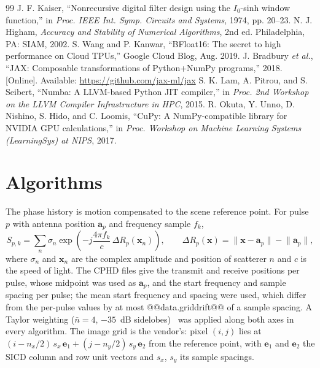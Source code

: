 \documentclass[11pt]{article}
\begin{document}
\begin{thebibliography}{99}
 J. F. Kaiser, ``Nonrecursive digital filter design using the $I_0$-sinh window function,'' in \emph{Proc. IEEE Int. Symp. Circuits and Systems}, 1974, pp. 20--23.
 N. J. Higham, \emph{Accuracy and Stability of Numerical Algorithms}, 2nd ed. Philadelphia, PA: SIAM, 2002.
 S. Wang and P. Kanwar, ``BFloat16: The secret to high performance on Cloud TPUs,'' Google Cloud Blog, Aug. 2019.
 J. Bradbury \emph{et al.}, ``JAX: Composable transformations of Python+NumPy programs,'' 2018. [Online]. Available: \url{https://github.com/jax-ml/jax}
 S. K. Lam, A. Pitrou, and S. Seibert, ``Numba: A LLVM-based Python JIT compiler,'' in \emph{Proc. 2nd Workshop on the LLVM Compiler Infrastructure in HPC}, 2015.
 R. Okuta, Y. Unno, D. Nishino, S. Hido, and C. Loomis, ``CuPy: A NumPy-compatible library for NVIDIA GPU calculations,'' in \emph{Proc. Workshop on Machine Learning Systems (LearningSys) at NIPS}, 2017.
\end{thebibliography}

\clearpage
\appendix
\section{Algorithms}
\label{app:algorithms}

The phase history is motion compensated to the scene reference point. For pulse $p$ with antenna position $\mathbf{a}_p$ and frequency sample $f_k$,
\begin{equation}
S_{p,k} = \sum_n \sigma_n \exp\!\left(-j \frac{4\pi f_k}{c}\, \Delta R_p(\mathbf{x}_n)\right),
\qquad
\Delta R_p(\mathbf{x}) = \lVert \mathbf{x} - \mathbf{a}_p \rVert - \lVert \mathbf{a}_p \rVert ,
\label{eq:signal}
\end{equation}
where $\sigma_n$ and $\mathbf{x}_n$ are the complex amplitude and position of scatterer $n$ and $c$ is the speed of light. The CPHD files give the transmit and receive positions per pulse, whose midpoint was used as $\mathbf{a}_p$, and the start frequency and sample spacing per pulse; the mean start frequency and spacing were used, which differ from the per-pulse values by at most @@data.griddrift@@ of a sample spacing. A Taylor weighting ($\bar{n}=4$, $-35$~dB sidelobes)~\cite{taylor1955} was applied along both axes in every algorithm. The image grid is the vendor's: pixel $(i, j)$ lies at $(i - n_x/2)\,s_x\,\mathbf{e}_1 + (j - n_y/2)\,s_y\,\mathbf{e}_2$ from the reference point, with $\mathbf{e}_1$ and $\mathbf{e}_2$ the SICD column and row unit vectors and $s_x$, $s_y$ its sample spacings.
\end{document}
